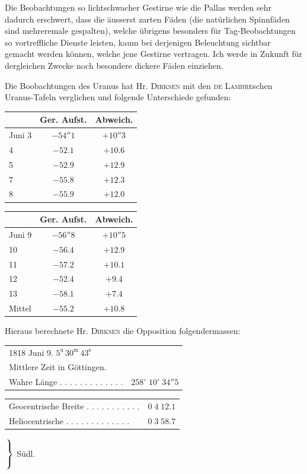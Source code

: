 \par\indent Die Beobachtungen so lichtschwacher Gestirne wie die Pallas werden sehr dadurch erschwert, dass die äusserst zarten Fäden (die natürlichen Spinnfäden sind mehreremale gespalten), welche übrigens besonders für Tag-Beobachtungen so vortreffliche Dienste leisten, kaum bei derjenigen Beleuchtung sichtbar gemacht werden können, welche jene Gestirne vertragen. Ich werde in Zukunft für dergleichen Zwecke noch besondere dickere Fäden einziehen.

\par\indent Die Boobachtungen des Uranus hat Hr. \textsc{Dirksen} mit den \textsc{de Lambre}schen Uranus-Tafeln verglichen und folgende Unterschiede gefunden: 

\begin{center}
\begin{tabular}{l|c|c}
 & Ger. Aufst. & Abweich. \\
\hline
Juni 3 & $-54''1$ & $+10''3$ \\
4 & $-52.1$ & $+10.6$ \\
5 & $-52.9$ & $+12.9$ \\
7 & $-55.8$ & $+12.3$ \\
8 & $-55.9$ & $+12.0$ \\
\end{tabular}
\par\medskip
\begin{tabular}{l|c|c}
 & Ger. Aufst. & Abweich. \\
\hline
Juni 9 & $-56''8$ & $+10''5$ \\
10 & $-56.4$ & $+12.9$ \\
11 & $-57.2$ & $+10.1$ \\
12 & $-52.4$ & $+9.4$ \\
13 & $-58.1$ & $+7.4$ \\
Mittel & $-55.2$ & $+10.8$ \\
\end{tabular}
\end{center}

\par\indent Hieraus berechnete Hr. \textsc{Dirksen} die Opposition folgendermassen:

\begin{center}
\begin{tabular}{ll}
\multicolumn{2}{l}{1818 Juni 9. $5^{\mathrm u}\,30^{\mathrm m}\,43^{\mathrm s}$} \\
\multicolumn{2}{l}{Mittlere Zeit in Göttingen.} \\
Wahre Länge . . . . . . . . . . . . . & $258^\circ\;10'\;34''5$ \\
\end{tabular}\par\smallskip
\begin{tabular}{ll}
Geocentrische Breite . . . . . . . . . . . & $0\;4\;12.1$ \\
Heliocentrische . . . . . . . . . . . . . & $0\;3\;58.7$ \\
\end{tabular} $\left.\rule{0pt}{2.2em}\right\}$ Südl.
\end{center}

